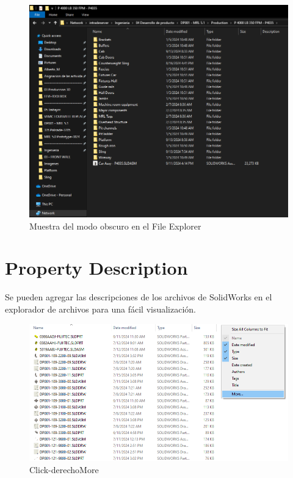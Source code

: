 \documentclass[12pt,letterpaper,final]{report}
\begin{document}
\begin{figure}[H]
	\centering
	\includegraphics[width=0.85\linewidth, height=0.5\textheight,keepaspectratio]{Imagenes/fe_dark_mode03}
	\caption{Muestra del modo obscuro en el File Explorer}
	\label{fig:fedarkmode03}
\end{figure}


\chapter{Property Description}
	
Se pueden agregar las descripciones de los archivos de SolidWorks en el explorador de archivos para una fácil visualización.

\begin{figure}[H]
	\centering
	\includegraphics[width=0.95\linewidth, height=0.5\textheight,keepaspectratio]{Imagenes/fe_prop_desc}
	\caption{Click-derecho\textrightarrow More}
	\label{fig:fepropdesc}
\end{figure}
\end{document}
